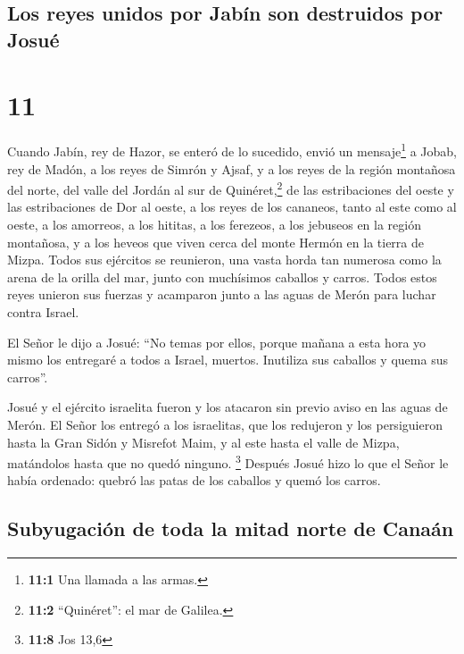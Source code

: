 \hypertarget{los-reyes-unidos-por-jabuxedn-son-destruidos-por-josuuxe9}{%
\subsection{Los reyes unidos por Jabín son destruidos por
Josué}\label{los-reyes-unidos-por-jabuxedn-son-destruidos-por-josuuxe9}}

\hypertarget{section-10}{%
\section{11}\label{section-10}}

 Cuando Jabín, rey de Hazor, se enteró de lo sucedido,
envió un mensaje\footnote{\textbf{11:1} Una llamada a las armas.} a
Jobab, rey de Madón, a los reyes de Simrón y Ajsaf,  y a
los reyes de la región montañosa del norte, del valle del Jordán al sur
de Quinéret,\footnote{\textbf{11:2} ``Quinéret'': el mar de Galilea.} de
las estribaciones del oeste y las estribaciones de Dor al oeste,
 a los reyes de los cananeos, tanto al este como al oeste,
a los amorreos, a los hititas, a los ferezeos, a los jebuseos en la
región montañosa, y a los heveos que viven cerca del monte Hermón en la
tierra de Mizpa.  Todos sus ejércitos se reunieron, una
vasta horda tan numerosa como la arena de la orilla del mar, junto con
muchísimos caballos y carros.  Todos estos reyes unieron
sus fuerzas y acamparon junto a las aguas de Merón para luchar contra
Israel.

 El Señor le dijo a Josué: ``No temas por ellos, porque
mañana a esta hora yo mismo los entregaré a todos a Israel, muertos.
Inutiliza sus caballos y quema sus carros''.

 Josué y el ejército israelita fueron y los atacaron sin
previo aviso en las aguas de Merón.  El Señor los entregó
a los israelitas, que los redujeron y los persiguieron hasta la Gran
Sidón y Misrefot Maim, y al este hasta el valle de Mizpa, matándolos
hasta que no quedó ninguno. \footnote{\textbf{11:8} Jos 13,6}
 Después Josué hizo lo que el Señor le había ordenado:
quebró las patas de los caballos y quemó los carros.

\hypertarget{subyugaciuxf3n-de-toda-la-mitad-norte-de-canauxe1n}{%
\subsection{Subyugación de toda la mitad norte de
Canaán}\label{subyugaciuxf3n-de-toda-la-mitad-norte-de-canauxe1n}}

